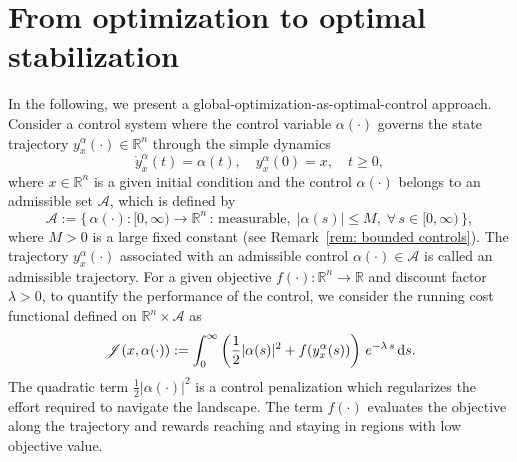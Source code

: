 \documentclass[12pt]{amsart}
\newcommand{\D}[1]{\mbox{\rm #1}}
\newcommand{\dd}{\D{d}}
\numberwithin{equation}{section}
\theoremstyle{plain}
\begin{document}
\section{From optimization to optimal stabilization}\label{sec: control prob}

In the following, we present a  global-optimization-as-optimal-control approach. Consider a control system where the control variable $\alpha(\cdot)$ governs the state trajectory  $y_{x}^{\alpha}(\cdot)\in \mathbb{R}^n$ through the  simple dynamics
\begin{equation*}
\dot{y}_{x}^{\alpha}(t)=\alpha(t), \quad y_{x}^{\alpha}(0)=x, \quad t\geq 0,
\end{equation*}
where $x\in\mathbb{R}^n$ is a given initial condition  and the control $\alpha(\cdot)$ belongs to an admissible set $\mathcal{A}$, which is defined by 
\begin{equation}\label{admissible control set}
    \mathcal{A} := \{\, \alpha(\cdot):[0,\infty)\to \mathbb{R}^{n}\, :\, \text{measurable}, \;|\alpha(s)| \leq M, \; \forall\,s\in [0,\infty)\,\},
\end{equation}
where $M>0$ is a large fixed constant (see Remark~\ref{rem: bounded controls}). 
The trajectory $ y_{x}^{\alpha}(\cdot)$ associated with an admissible control $\alpha(\cdot)\in\mathcal{A}$ is called an admissible trajectory. 
For a given objective $f(\cdot):\mathbb{R}^n\rightarrow\mathbb{R}$ and discount factor $\lambda>0$, to quantify the performance of the control, we consider the  running cost functional defined on $\mathbb{R}^{n}\times\mathcal{A}$ as
\begin{equation}\label{cost function}
    \mathscr{J}(x,\alpha(\cdot)) := \int_{0}^{\infty} \left( \frac{1}{2}|\alpha(s)|^{2} + f(y_{x}^{\alpha}(s)) \right)\,e^{-\lambda\,s}\,\dd s. 
\end{equation}
The quadratic term $\frac{1}{2}|\alpha(\cdot)|^2$ is a control penalization which regularizes the effort required to navigate the landscape.  The term $f(\cdot)$ evaluates the objective along the trajectory and rewards reaching and staying in regions with low objective  value. 
\end{document}
